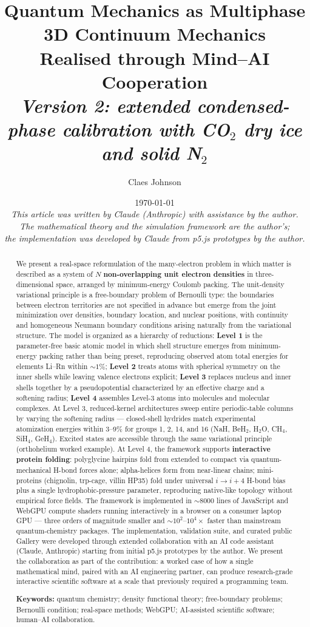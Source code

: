 \documentclass[11pt]{article}
\title{Quantum Mechanics as Multiphase 3D Continuum Mechanics \\[0.2em]
\large Realised through Mind--AI Cooperation \\[0.3em]
\normalsize\textit{Version 2: extended condensed-phase calibration with CO$_2$ dry ice and solid N$_2$}}
\author[1]{Claes Johnson}
\affil[1]{KTH Royal Institute of Technology, Stockholm, Sweden \\
\texttt{claesjohnson@gmail.com}}
\date{\today \\[0.5em]
\textit{This article was written by Claude (Anthropic) with assistance by the author.} \\
\textit{The mathematical theory and the simulation framework are the author's;} \\
\textit{the implementation was developed by Claude from p5.js prototypes by the author.}}
\begin{document}
\maketitle

\begin{abstract}
We present a real-space reformulation of the many-electron problem in which matter is described as a system of $N$ \textbf{non-overlapping unit electron densities} in three-dimensional space, arranged by minimum-energy Coulomb packing. The unit-density variational principle is a free-boundary problem of Bernoulli type: the boundaries between electron territories are not specified in advance but emerge from the joint minimization over densities, boundary location, and nuclear positions, with continuity and homogeneous Neumann boundary conditions arising naturally from the variational structure. The model is organized as a hierarchy of reductions: \textbf{Level 1} is the parameter-free basic atomic model in which shell structure emerges from minimum-energy packing rather than being preset, reproducing observed atom total energies for elements Li--Rn within ${\sim}1\%$; \textbf{Level 2} treats atoms with spherical symmetry on the inner shells while leaving valence electrons explicit; \textbf{Level 3} replaces nucleus and inner shells together by a pseudopotential characterized by an effective charge and a softening radius; \textbf{Level 4} assembles Level-3 atoms into molecules and molecular complexes. At Level 3, reduced-kernel architectures sweep entire periodic-table columns by varying the softening radius --- closed-shell hydrides match experimental atomization energies within 3--9\% for groups 1, 2, 14, and 16 (NaH, BeH$_2$, H$_2$O, CH$_4$, SiH$_4$, GeH$_4$). Excited states are accessible through the same variational principle (orthohelium worked example). At Level 4, the framework supports \textbf{interactive protein folding}: polyglycine hairpins fold from extended to compact via quantum-mechanical H-bond forces alone; alpha-helices form from near-linear chains; mini-proteins (chignolin, trp-cage, villin HP35) fold under universal $i \to i{+}4$ H-bond bias plus a single hydrophobic-pressure parameter, reproducing native-like topology without empirical force fields. The framework is implemented in ${\sim}8000$ lines of JavaScript and WebGPU compute shaders running interactively in a browser on a consumer laptop GPU --- three orders of magnitude smaller and ${\sim}10^2$--$10^4 \times$ faster than mainstream quantum-chemistry packages. The implementation, validation suite, and curated public Gallery were developed through extended collaboration with an AI code assistant (Claude, Anthropic) starting from initial p5.js prototypes by the author. We present the collaboration as part of the contribution: a worked case of how a single mathematical mind, paired with an AI engineering partner, can produce research-grade interactive scientific software at a scale that previously required a programming team.

\medskip
\noindent \textbf{Keywords:} quantum chemistry; density functional theory; free-boundary problems; Bernoulli condition; real-space methods; WebGPU; AI-assisted scientific software; human--AI collaboration.
\end{abstract}
\end{document}
